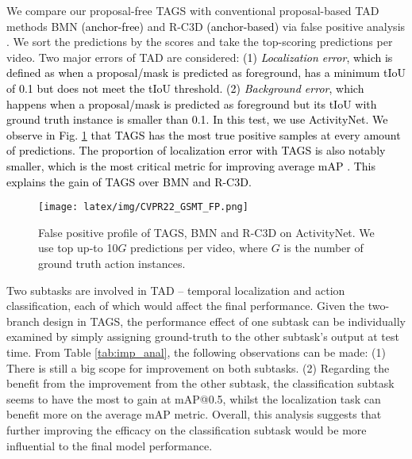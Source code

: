 \documentclass[runningheads]{llncs}
\newcommand{\shortmodelname}{TAGS}
\begin{document}
We compare our proposal-free {\shortmodelname} with conventional proposal-based TAD methods BMN \cite{bai2020boundary} \textcolor{black}{(anchor-free)} and R-C3D \cite{xu2017r} \textcolor{black}{(anchor-based)} via false positive analysis \cite{alwassel2018diagnosing}. We sort the predictions by the scores and take the top-scoring predictions per video. Two major errors of TAD are considered:
\textcolor{black}{(1) {\em Localization error}, which is defined as when a proposal/mask is predicted as foreground, has a minimum tIoU of 0.1 but does not meet the tIoU threshold. 
(2) {\em Background error}, which happens when a proposal/mask
is predicted as foreground but its tIoU with ground truth instance is smaller than 0.1.
In this test, we use ActivityNet. 
\textcolor{black}{We observe in Fig. \ref{fig:error_prof} that {\shortmodelname} has the most true positive samples at every
amount of predictions. The proportion of localization error
with {\shortmodelname} is also notably smaller,
which is the most critical metric for improving average mAP \cite{alwassel2018diagnosing}.
This explains the gain of {\shortmodelname} over BMN and R-C3D.
}
}
\begin{figure}[h]
    \centering
    \texttt{[image: latex/img/CVPR22\_GSMT\_FP.png]}
\caption{False positive profile of {\shortmodelname}, BMN and R-C3D on ActivityNet.
  We use top up-to 10$G$ predictions per video, where $G$ is the number of ground truth action instances.}
    \label{fig:error_prof}
\end{figure}




Two subtasks are involved in TAD -- temporal localization and action classification, each of which would affect the final performance. 
Given the two-branch design in {\shortmodelname},
the performance effect of one subtask can be individually examined
by simply assigning ground-truth to the other subtask's output at test time.
From Table \ref{tab:imp_anal}, the following observations can be made:
(1) There is still a big scope for improvement  on both subtasks.
(2) Regarding the benefit from the improvement from the other subtask, the classification subtask seems to have the most to gain at mAP@0.5, 
whilst the localization task  can benefit more on the average mAP metric.
Overall, this analysis suggests that further improving the efficacy on the classification subtask would be more influential to the final model performance. 
\end{document}
